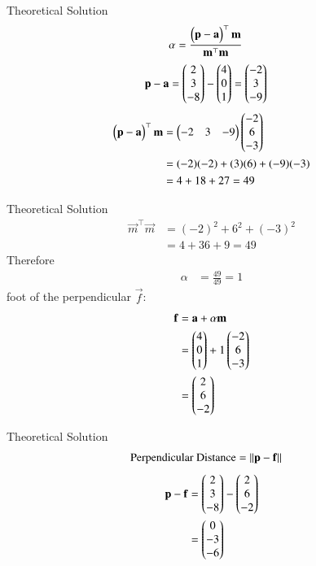 \documentclass{beamer}
\begin{document}
\begin{frame}{Theoretical Solution}
\begin{align}
\alpha &= \frac{\begin{pmatrix}\mathbf{p}-\mathbf{a}\end{pmatrix}^\top \mathbf{m}}{\mathbf{m}^\top \mathbf{m}}
\end{align}
\begin{align}
\mathbf{p}-\mathbf{a} &= \begin{pmatrix}2 \\ 3 \\ -8\end{pmatrix} - \begin{pmatrix}4 \\ 0 \\ 1\end{pmatrix} = \begin{pmatrix}-2 \\ 3 \\ -9\end{pmatrix}
\end{align}
\begin{align}
\begin{pmatrix}\mathbf{p}-\mathbf{a}\end{pmatrix}^\top \mathbf{m} &= \begin{pmatrix}-2 & 3 & -9\end{pmatrix} \begin{pmatrix}-2 \\ 6 \\ -3\end{pmatrix} \\
&= (-2)(-2) + (3)(6) + (-9)(-3) \\
&= 4 + 18 + 27 = 49
\end{align}
\end{frame}

\begin{frame}{Theoretical Solution}
\begin{align}
\vec{m}^\top \vec{m} &= (-2)^2 + 6^2 + (-3)^2 \\
&= 4 + 36 + 9 = 49
\end{align}
Therefore
\begin{align}
\alpha &= \frac{49}{49} = 1
\end{align}
foot of the perpendicular $\vec{f}$:
\begin{align}
\mathbf{f} &= \mathbf{a} + \alpha\mathbf{m} \\
&= \begin{pmatrix}4 \\ 0 \\ 1\end{pmatrix} + 1 \begin{pmatrix}-2 \\ 6 \\ -3\end{pmatrix} \\
&= \begin{pmatrix}2 \\ 6 \\ -2\end{pmatrix}
\end{align}
\end{frame}

\begin{frame}{Theoretical Solution}
\begin{align}
\text{Perpendicular Distance} &= \left\lVert\mathbf{p}-\mathbf{f}\right\rVert
\end{align}
\begin{align}
\mathbf{p}-\mathbf{f} &= \begin{pmatrix}2 \\ 3 \\ -8\end{pmatrix} - \begin{pmatrix}2 \\ 6 \\ -2\end{pmatrix} \\
&=\begin{pmatrix}0 \\ -3 \\ -6\end{pmatrix}
\end{align}
\end{frame}
\end{document}

